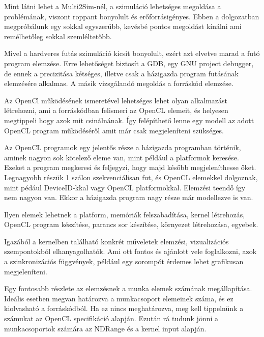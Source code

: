 
Mint látni lehet a Multi2Sim-nél, a szimuláció lehetséges megoldása a problémának, viszont roppant bonyolult és erőforrásigényes. Ebben a dolgozatban megpróbálunk egy sokkal egyszerűbb, kevésbé pontos megoldást kínálni ami remélhetőleg sokkal szemléltetőbb. 

Mivel a hardveres futás szimuláció kicsit bonyolult, ezért azt elvetve marad a futó program elemzése. Erre lehetőséget biztosít a GDB, egy GNU project debugger, de ennek a precizitása kétséges, illetve csak a házigazda program futásának elemzésére alkalmas. A másik vizsgálandó megoldás a forráskód elemzése.

 Az OpenCl működésének ismeretével lehetséges lehet olyan alkalmazást létrehozni, ami a forráskódban felismeri az OpenCL elemeit, és helyesen megtippeli hogy azok mit csinálnának. Így felépíthető lenne egy modell az adott OpenCL program működéséről amit már csak megjeleníteni szükséges.
 
Az OpenCL programok egy jelentős része a házigazda programban történik, aminek nagyon sok kötelező eleme van, mint például a platformok keresése. Ezeket a program megkeresi és feljegyzi, hogy majd később megjeleníthesse őket. Legnagyobb részük 1 szálon szekvenciálisan fut, és OpenCL elemekkel dolgoznak, mint pédául DeviceID-kkal vagy OpenCL platformokkal. Elemzési teendő így nem nagyon van. Ekkor a házigazda program nagy része már modellezve is van.

Ilyen elemek lehetnek a platform, memóriák felszabadítása, kernel létrehozás, OpenCL program készítése, parancs sor készítése, környezet létrehozása, egyebek.



Igazából a kernelben található konkrét műveletek elemzési, vizualizációs szempontokból elhanyagolhatók. Ami ott fontos és ajánlott vele foglalkozni, azok a szinkronizációs függvények, például egy sorompót érdemes lehet grafikusan megjeleníteni.

Egy fontosabb részlete az elemzésnek a munka elemek számának megállapítása. Ideális esetben megvan határozva a munkacsoport elemeinek száma, és ez kiolvasható a forráskódból. Ha ez nincs meghatározva, meg kell tippelnünk a számukat az OpenCL specifikáció alapján. Ezután rá tudunk jönni a munkacsoportok számára az NDRange és a kernel input alapján.


